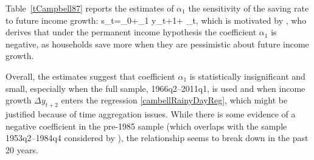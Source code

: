 \documentclass[titlepage]{\econtex}
\begin{document}
Table~\ref{tCampbell87} reports the estimates of $\alpha_1$ the sensitivity of the saving rate to future income growth:
\be
s_t=\alpha_0+\alpha_1 \Delta y_{t+1}+ \varepsilon_t, \label{cambellRainyDayReg}
\ee
which is motivated by \cite{cam87}, who derives that under the permanent income hypothesis the coefficient $\alpha_1$ is negative, as households save more when they are pessimistic about future income growth.

Overall, the estimates suggest that coefficient $\alpha_1$ is statistically insignificant and small, especially when the full sample, 1966q2--2011q1, is used and when income growth $\Delta y_{t+2}$ enters the regression \eqref{cambellRainyDayReg}, which might be justified because of time aggregation issues. While there is some evidence of a negative coefficient in the pre-1985 sample (which overlaps with the sample 1953q2--1984q4 considered by \cite{cam87}), the relationship seems to break down in the past 20 years.



\newpage









\end{document}
